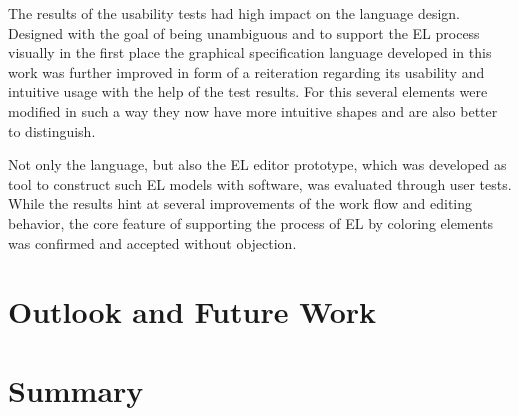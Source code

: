 \documentclass[twoside, openright, 12pt]{book}
\begin{document}
The results of the usability tests had high impact on the language design.
Designed with the goal of being unambiguous and to support the EL process visually in the first place the graphical specification language developed in this work was further improved in form of a reiteration regarding its usability and intuitive usage with the help of the test results.
For this several elements were modified in such a way they now have more intuitive shapes and are also better to distinguish.

Not only the language, but also the EL editor prototype, which was developed as tool to construct such EL models with software, was evaluated through user tests.
While the results hint at several improvements of the work flow and editing behavior, the core feature of supporting the process of EL by coloring elements was confirmed and accepted without objection.



\cleardoublepage
\chapter{Outlook and Future Work}
\label{conclusion}
\blindtext



\cleardoublepage
\chapter{Summary}
\label{summary}
\blindtext







\cleardoublepage
\DeclareRobustCommand{\citeext}[1]{\citeauthor{#1}~\cite{#1}}




\end{document}
